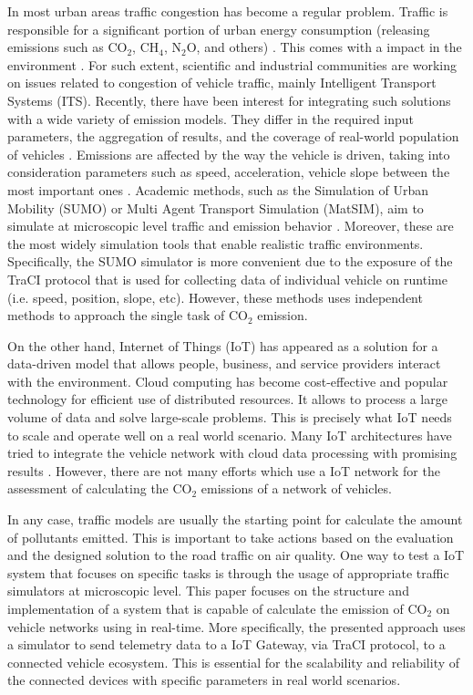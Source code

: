 \documentclass[letter, 10pt, conference]{ieeeconf}
\begin{document}
In most urban areas traffic congestion has become a regular problem.
Traffic is responsible for a significant portion of urban energy consumption (releasing emissions such as CO$_2$, CH$_4$, N$_2$O, and others) \cite{patterson_preparing_nodate}.
This comes with a impact in the environment \cite{karagiannis_vehicular_2011}.
For such extent, scientific and industrial communities are working on issues related to congestion of vehicle traffic, mainly Intelligent Transport Systems (ITS).
Recently, there have been interest for integrating such solutions with a wide variety of emission models.
They differ in the required input parameters, the aggregation of results, and the coverage of real-world population of vehicles \cite{hofer_large_2018}.
Emissions are affected by the way the vehicle is driven, taking into consideration parameters such as speed, acceleration, vehicle slope between the most important ones \cite{noauthor_intergovernmental_2001}.
Academic methods, such as the Simulation of Urban Mobility (SUMO) or Multi Agent Transport Simulation (MatSIM), aim to simulate at microscopic level traffic and emission behavior \cite{bazzan_multi-agent_2009}.
Moreover, these are the most widely simulation tools that enable realistic traffic environments.
Specifically, the SUMO simulator is more convenient due to the exposure of the TraCI protocol that is used for collecting data of individual vehicle on runtime (i.e. speed, position, slope, etc).
However, these methods uses independent methods to approach the single task of CO$_2$ emission.

On the other hand, Internet of Things (IoT) has appeared as a solution for a data-driven model that allows people, business, and service providers interact with the environment.
Cloud computing has become cost-effective and popular technology for efficient use of distributed resources.
It allows to process a large volume of data and solve large-scale problems.
This is precisely what IoT needs to scale and operate well on a real world scenario.
Many IoT architectures have tried to integrate the vehicle network with cloud data processing with promising results \cite{tarneberg_experiences_2016}.
However, there are not many efforts which use a IoT network for the assessment of calculating the CO$_2$ emissions of a network of vehicles.

In any case, traffic models are usually the starting point for calculate the amount of pollutants emitted.
This is important to take actions based on the evaluation and the designed solution to the road traffic on air quality.
One way to test a IoT system that focuses on specific tasks is through the usage of appropriate traffic simulators at microscopic level.
This paper focuses on the structure and implementation of a system that is capable of calculate the emission of CO$_2$ on vehicle networks using in real-time.
More specifically, the presented approach uses a simulator to send telemetry data to a IoT Gateway, via TraCI protocol, to a connected vehicle ecosystem.
This is essential for the scalability and reliability of the connected devices with specific parameters in real world scenarios.
\end{document}
